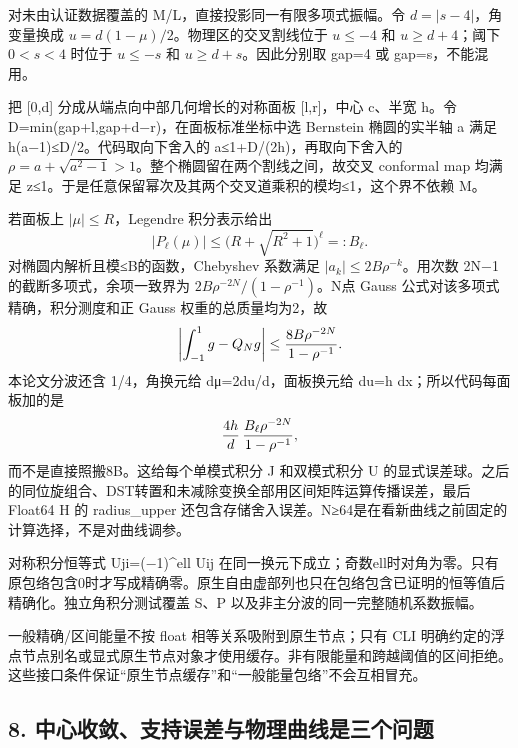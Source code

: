 \documentclass[
  10pt,
  a4paper,
]{article}
\begin{document}
对未由认证数据覆盖的 M/L，直接投影同一有限多项式振幅。令
\(d=|s-4|\)，角变量换成 \(u=d(1-\mu)/2\)。物理区的交叉割线位于
\(u\le-4\) 和 \(u\ge d+4\)；阈下 \(0<s<4\) 时位于 \(u\le-s\) 和
\(u\ge d+s\)。因此分别取 gap=4 或 gap=s，不能混用。

把 {[}0,d{]} 分成从端点向中部几何增长的对称面板 {[}l,r{]}，中心 c、半宽
h。令 D=min(gap+l,gap+d−r)，在面板标准坐标中选 Bernstein 椭圆的实半轴 a
满足 h(a−1)≤D/2。代码取向下舍入的 a≤1+D/(2h)，再取向下舍入的
\(\rho=a+\sqrt{a^2-1}>1\)。整个椭圆留在两个割线之间，故交叉 conformal
map 均满足
\textbar z\textbar≤1。于是任意保留幂次及其两个交叉道乘积的模均≤1，这个界不依赖
M。

若面板上 \(|\mu|\le R\)，Legendre 积分表示给出 \[
|P_\ell(\mu)|\le\bigl(R+\sqrt{R^2+1}\bigr)^\ell=:B_\ell.
\] 对椭圆内解析且模≤B的函数，Chebyshev 系数满足
\(|a_k|\le2B\rho^{-k}\)。用次数 2N−1 的截断多项式，余项一致界为
\(2B\rho^{-2N}/(1-\rho^{-1})\)。N点 Gauss
公式对该多项式精确，积分测度和正 Gauss 权重的总质量均为2，故 \[
\left|\int_{-1}^1g-Q_Ng\right|
\le {8B\rho^{-2N}\over1-\rho^{-1}}.
\] 本论文分波还含 1/4，角换元给 dμ=2du/d，面板换元给 du=h
dx；所以代码每面板加的是 \[
{4h\over d}\,{B_\ell\rho^{-2N}\over1-\rho^{-1}},
\] 而不是直接照搬8B。这给每个单模式积分 J 和双模式积分 U
的显式误差球。之后的同位旋组合、DST转置和未减除变换全部用区间矩阵运算传播误差，最后
Float64 H 的 radius\_upper
还包含存储舍入误差。N≥64是在看新曲线之前固定的计算选择，不是对曲线调参。

对称积分恒等式 Uji=(−1)\^{}ell Uij
在同一换元下成立；奇数ell时对角为零。只有原包络包含0时才写成精确零。原生自由虚部列也只在包络包含已证明的恒等值后精确化。独立角积分测试覆盖
S、P 以及非主分波的同一完整随机系数振幅。

一般精确/区间能量不按 float 相等关系吸附到原生节点；只有 CLI
明确约定的浮点节点别名或显式原生节点对象才使用缓存。非有限能量和跨越阈值的区间拒绝。这些接口条件保证``原生节点缓存''和``一般能量包络''不会互相冒充。

\subsection{8.
中心收敛、支持误差与物理曲线是三个问题}\label{ux4e2dux5fc3ux6536ux655bux652fux6301ux8befux5deeux4e0eux7269ux7406ux66f2ux7ebfux662fux4e09ux4e2aux95eeux9898}
\end{document}
